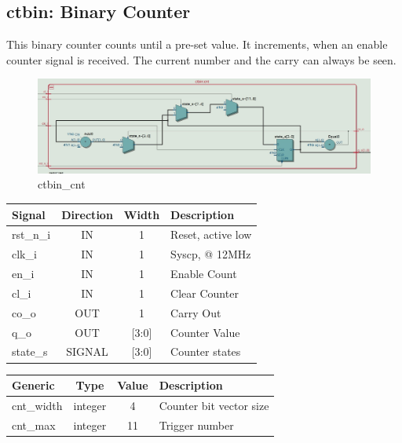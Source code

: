 \documentclass[12pt,a4 paper] {report}
\begin{document}
\newpage

\subsection{ctbin: Binary Counter}
This binary counter counts until a pre-set value. It increments, when an enable counter signal is received. The current 
number and the carry can always be seen.
\begin{figure}[h]
	\centering	
	\includegraphics[scale=0.3]{../png/ctbin_cnt.png}
	\caption{ctbin\_cnt}
\end{figure}
\begin{center}
	\begin{tabular}{ | p{2cm} | c | c | p{5cm} |}
		\hline
		\textbf{Signal} & \textbf{Direction} & \textbf{Width} & \textbf{Description} \\
		\hline
		\hline
 		 rst\_n\_i & IN & 1 & Reset, active low \\
 		 \hline
		clk\_i & IN & 1 & Syscp, @ 12MHz \\
		\hline
		en\_i & IN & 1 & Enable Count \\
		\hline
		cl\_i & IN & 1 & Clear Counter \\
		\hline
		co\_o & OUT & 1 & Carry Out \\
		\hline
		q\_o & OUT & [3:0] & Counter Value \\
		\hline
		\hline
		state\_s & SIGNAL & [3:0] & Counter states\\
		\hline
	\end{tabular}
\end{center}
\begin{center}
	\begin{tabular}{| p{2cm} | c | c | p{5cm} |}
		\hline
		\textbf{Generic} & \textbf{Type} & \textbf{Value} & \textbf{Description} \\
		\hline
 		cnt\_width & integer & 4 & Counter bit vector size \\
		\hline
		cnt\_max & integer & 11 & Trigger number \\
		\hline
	\end{tabular}	
\end{center}
\end{document}
